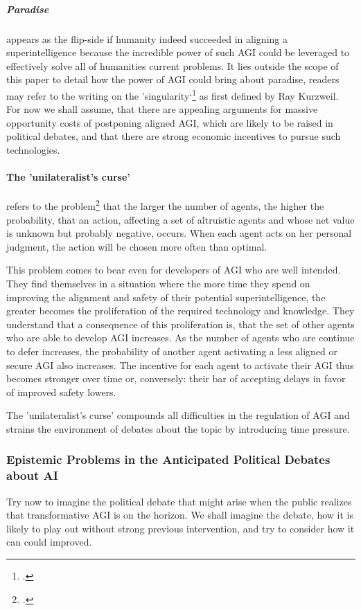 \documentclass[12pt, a4paper]{article}
\begin{document}
			\subparagraph[Successful alignment]{Paradise}
				appears as the flip-side if humanity indeed succeeded in aligning a superintelligence because the incredible power of such AGI could be leveraged to effectively solve all of humanities current problems.
				It lies outside the scope of this paper to detail how the power of AGI could bring about paradise, readers may refer to the writing on the 'singularity‘\footcite{kruger2021singularity} as first defined by Ray Kurzweil.
				For now we shall assume, that there are appealing arguments for massive opportunity costs of postponing aligned AGI, which are likely to be raised in political debates, and that there are strong economic incentives to pursue such technologies.
				
		\paragraph{The 'unilateralist's curse'}
			refers to the problem\footcite{bostrom2016unilateralist} that the larger the number of agents, the higher the probability, that an action, affecting a set of altruistic agents and whose net value is unknown but probably negative, occurs.
			When each agent acts on her personal judgment, the action will be chosen more often than optimal.
			
			This problem comes to bear even for developers of AGI who are well intended.
			They find themselves in a situation where the more time they spend on improving the alignment and safety of their potential superintelligence, the greater becomes the proliferation of the required technology and knowledge.
			They understand that a consequence of this proliferation is, that the set of other agents who are able to develop AGI increases.
			As the number of agents who are continue to defer increases, the probability of another agent activating a less aligned or secure AGI also increases.
			The incentive for each agent to activate their AGI thus becomes stronger over time or, conversely: their bar of accepting delays in favor of improved safety lowers.
			
			The 'unilateralist's curse' compounds all difficulties in the regulation of AGI and strains the environment of debates about the topic by introducing time pressure.
				
		\subsubsection{Epistemic Problems in the Anticipated Political Debates about AI}
			Try now to imagine the political debate that might arise when the public realizes that transformative AGI is on the horizon.
			We shall imagine the debate, how it is likely to play out without strong previous intervention, and try to consider how it can could improved.
			
\end{document}
